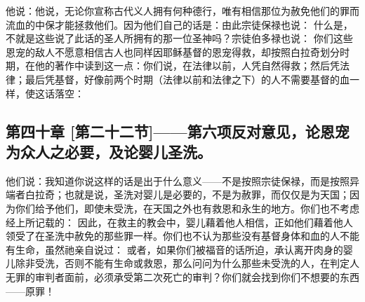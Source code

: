 他说：他说，无论你宣称古代义人拥有何种德行，唯有相信那位为赦免他们的罪而流血的中保才能拯救他们。因为他们自己的话是：由此宗徒保禄也说： 什么是，不就是这些说了此话的圣人所拥有的那一位圣神吗？宗徒伯多禄也说： 你们这些恩宠的敌人不愿意相信古人也同样因耶稣基督的恩宠得救，却按照白拉奇划分时期，在他的著作中读到这一点：你们说，在法律以前，人凭自然得救；然后凭法律；最后凭基督，好像前两个时期（法律以前和法律之下）的人不需要基督的血一样，使这话落空：\par


\subsection{第四十章 [第二十二节]——第六项反对意见，论恩宠为众人之必要，及论婴儿圣洗。}

他们说：我知道你说这样的话是出于什么意义——不是按照宗徒保禄，而是按照异端者白拉奇；也就是说，圣洗对婴儿是必要的，不是为赦罪，而仅仅是为天国；因为你们给予他们，即使未受洗，在天国之外也有救恩和永生的地方。你们也不考虑经上所记载的： 因此，在救主的教会中，婴儿藉着他人相信，正如他们藉着他人领受了在圣洗中赦免的那些罪一样。你们也不认为那些没有基督身体和血的人不能有生命，虽然祂亲自说过： 或者，如果你们被福音的话所迫，承认离开肉身的婴儿除非受洗，否则不能有生命或救恩，那么问问为什么那些未受洗的人，在判定人无罪的审判者面前，必须承受第二次死亡的审判？你们就会找到你们不想要的东西——原罪！\par


